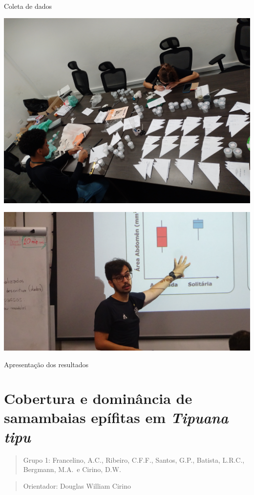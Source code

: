 \documentclass[
]{book}
\begin{document}
Coleta de dados

\begin{center}\includegraphics[width=0.7\linewidth]{figs/coleta2} \end{center}

\begin{center}\includegraphics[width=0.7\linewidth]{figs/apresentacao1} \end{center}

Apresentação dos resultados

\chapter{\texorpdfstring{Cobertura e dominância de samambaias epífitas em \emph{Tipuana tipu}}{Cobertura e dominância de samambaias epífitas em Tipuana tipu}}\label{cobertura-e-dominuxe2ncia-de-samambaias-epuxedfitas-em-tipuana-tipu}

\begin{quote}
Grupo 1: Francelino, A.C., Ribeiro, C.F.F., Santos, G.P., Batista, L.R.C., Bergmann, M.A.~e Cirino, D.W.
\end{quote}

\begin{quote}
Orientador: Douglas William Cirino
\end{quote}
\end{document}
